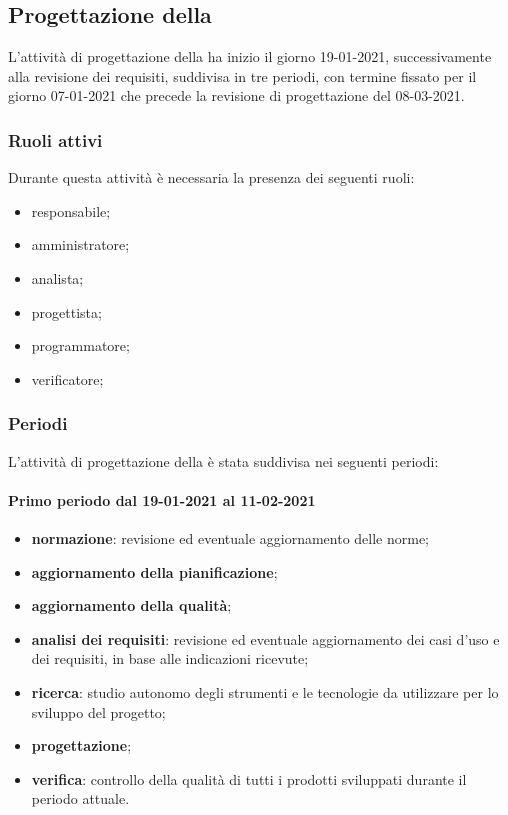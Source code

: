 \newpage 

\subsection{Progettazione della } 
L'attività di progettazione della  ha inizio il giorno 19-01-2021, successivamente alla revisione dei requisiti, suddivisa in tre periodi, con termine fissato per il giorno 07-01-2021 che precede la revisione di progettazione del 08-03-2021. 

\subsubsection{Ruoli attivi} 
Durante questa attività è necessaria la presenza dei seguenti ruoli: 
\begin{itemize} 
	\item responsabile; 
	\item amministratore; 
	\item analista; 
	\item progettista; 
	\item programmatore; 
	\item verificatore; 
\end{itemize} 

\subsubsection{Periodi} 
L'attività di progettazione della  è stata suddivisa nei seguenti periodi: 

\paragraph{Primo periodo dal 19-01-2021 al 11-02-2021} 
\begin{itemize} 
	\item \textbf{normazione}: revisione ed eventuale aggiornamento delle norme; 
	\item \textbf{aggiornamento della pianificazione}; 
	\item \textbf{aggiornamento della qualità}; 
	\item \textbf{analisi dei requisiti}: revisione ed eventuale aggiornamento dei casi d’uso e dei requisiti, in base alle indicazioni ricevute; 
	\item \textbf{ricerca}: studio autonomo degli strumenti e le tecnologie da utilizzare per lo sviluppo del 
	progetto; 
	\item \textbf{progettazione}; 
	\item \textbf{verifica}: controllo della qualità di tutti i prodotti sviluppati durante il periodo attuale. 
\end{itemize} 

